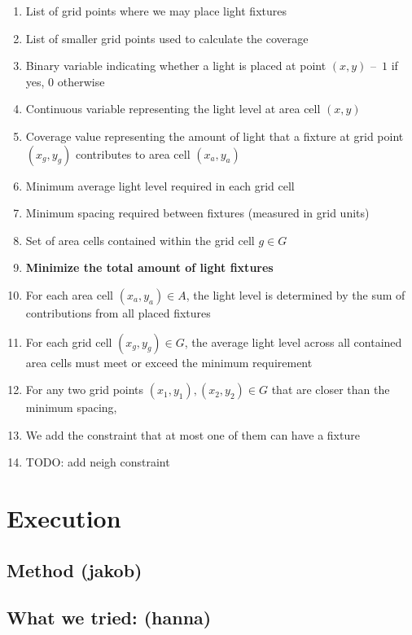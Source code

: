 \documentclass{article}
\begin{document}
\begin{enumerate}
    \item List of grid points where we may place light fixtures
    \item List of smaller grid points used to calculate the coverage
    \item Binary variable indicating whether a light is placed at point $(x, y)$ – $1$ if yes, $0$ otherwise
    \item Continuous variable representing the light level at area cell $(x, y)$
    \item Coverage value representing the amount of light that a fixture at grid point $(x_g,y_g)$ contributes to area cell $(x_a,y_a)$
    \item Minimum average light level required in each grid cell
    \item Minimum spacing required between fixtures (measured in grid units)
    \item Set of area cells contained within the grid cell $g \in G$
    \item \textbf{Minimize the total amount of light fixtures}
    \item For each area cell $(x_a,y_a) \in A$, the light level is determined by the sum of contributions from all placed fixtures
    \item For each grid cell $(x_g,y_g) \in G$, the average light level across all contained area cells must meet or exceed the minimum requirement
    \item For any two grid points $(x_1,y_1), (x_2,y_2) \in G$ that are closer than the minimum spacing,
    \item We add the constraint that at most one of them can have a fixture
    \item TODO: add neigh constraint 
\end{enumerate}

\newpage

\section{Execution}
\subsection{Method (jakob)}
\subsection{What we tried: (hanna)}
\end{document}
